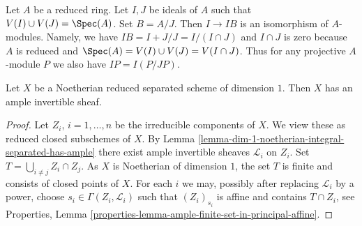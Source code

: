 \begin{remark}
\label{remark-conductor}
Let $A$ be a reduced ring. Let $I, J$ be ideals of $A$
such that $V(I) \cup V(J) = \Spec(A)$. Set $B = A/J$.
Then $I \to IB$ is an isomorphism of $A$-modules. Namely, we
have $IB = I + J/J = I/(I \cap J)$ and $I \cap J$ is zero because
$A$ is reduced and $\Spec(A) = V(I) \cup V(J) = V(I \cap J)$.
Thus for any projective $A$-module $P$ we also have $IP = I(P/JP)$.
\end{remark}

\begin{lemma}
\label{lemma-dim-1-noetherian-reduced-separated-has-ample}
Let $X$ be a Noetherian reduced separated scheme of dimension $1$.
Then $X$ has an ample invertible sheaf.
\end{lemma}

\begin{proof}
Let $Z_i$, $i = 1, \ldots, n$ be the irreducible components of $X$.
We view these as reduced closed subschemes of $X$.
By Lemma \ref{lemma-dim-1-noetherian-integral-separated-has-ample}
there exist ample invertible sheaves $\mathcal{L}_i$ on $Z_i$.
Set $T = \bigcup_{i \not = j} Z_i \cap Z_j$. As $X$ is Noetherian
of dimension $1$, the set $T$ is finite and consists of closed
points of $X$. For each $i$ we may, possibly after replacing
$\mathcal{L}_i$ by a power, choose $s_i \in \Gamma(Z_i, \mathcal{L}_i)$
such that $(Z_i)_{s_i}$ is affine and contains $T \cap Z_i$, see
Properties, Lemma \ref{properties-lemma-ample-finite-set-in-principal-affine}.


\end{proof}
